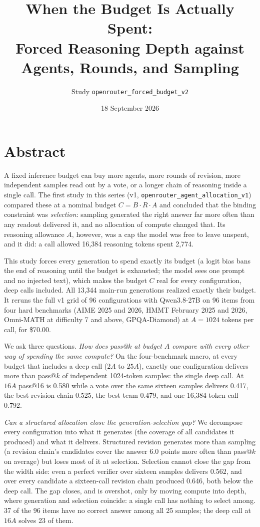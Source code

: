 \documentclass[11pt]{article}
\title{\vspace{-2em}When the Budget Is Actually Spent:\\
Forced Reasoning Depth against Agents, Rounds, and Sampling}
\author{Study \texttt{openrouter\_forced\_budget\_v2}}
\date{18 September 2026}
\begin{document}
\maketitle
\vspace{-1.5em}

\section*{Abstract}

A fixed inference budget can buy more agents, more rounds of revision, more independent samples read
out by a vote, or a longer chain of reasoning inside a single call. The first study in this series
(v1, \texttt{openrouter\_agent\_\allowbreak allocation\_v1}) compared these at a nominal budget
$C = B \cdot R \cdot A$ and concluded that the binding constraint was \emph{selection}: sampling generated
the right answer far more often than any readout delivered it, and no allocation of compute changed that.
Its reasoning allowance $A$, however, was a cap the model was free to leave unspent, and it did: a call
allowed 16,384 reasoning tokens spent 2,774.

This study forces every generation to spend exactly its budget (a logit bias bans the end of reasoning until
the budget is exhausted; the model sees one prompt and no injected text), which makes the budget $C$ real
for every configuration, deep calls included. All 13,344 main-run generations realized
exactly their budget. It reruns the full v1 grid of 96 configurations with
Qwen3.8-27B on 96 items from four hard benchmarks (AIME 2025 and 2026, HMMT February 2025 and
2026, Omni-MATH at difficulty 7 and above, GPQA-Diamond) at $A = 1024$ tokens per call, for
\$70.00.

We ask three questions. \emph{How does pass@$k$ at budget $A$ compare with every other way of spending the
same compute?} On the four-benchmark macro, at every budget that includes a deep call ($2A$ to $25A$), exactly
one configuration delivers more than pass@$k$ of independent 1024-token samples: the single deep call. At $16A$ pass@16 is
0.580 while a vote over the same sixteen samples delivers
0.417, the best revision chain 0.525, the best
team 0.479, and one 16,384-token call 0.792.

\emph{Can a structured allocation close the generation-selection gap?} We decompose every configuration
into what it generates (the coverage of all candidates it produced) and what it delivers. Structured
revision generates more than sampling (a revision chain's candidates cover the answer
6.0 points more often than pass@$k$ on average)
but loses most of it at selection. Selection cannot close the gap from the width side: even a perfect
verifier over sixteen samples delivers 0.562, and over every candidate a
sixteen-call revision chain produced 0.646, both below the deep call.
The gap closes, and is overshot, only by moving compute into depth, where generation and selection
coincide: a single call has nothing to select among. 37 of the 96 items have
no correct answer among all 25 samples; the deep call at $16A$ solves 23 of
them.
\end{document}
